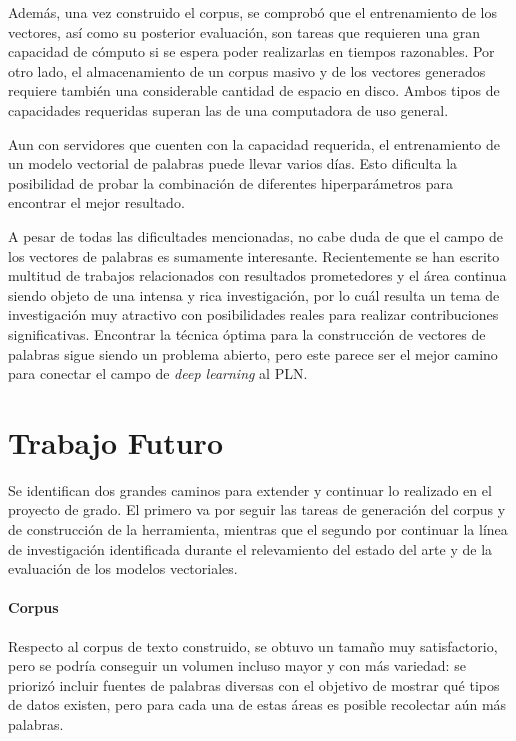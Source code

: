 Además, una vez construido el corpus, se comprobó que el entrenamiento de los vectores, así como su
posterior evaluación, son tareas que requieren una gran capacidad de cómputo si se espera poder
realizarlas en tiempos razonables. Por otro lado, el almacenamiento de un corpus masivo y de los
vectores generados requiere también una considerable cantidad de espacio en disco. Ambos tipos de
capacidades requeridas superan las de una computadora de uso general.

Aun con servidores que cuenten con la capacidad requerida, el entrenamiento de un modelo vectorial de
palabras puede llevar varios días. Esto dificulta la posibilidad de probar la combinación de diferentes
hiperparámetros para encontrar el mejor resultado.

A pesar de todas las dificultades mencionadas, no cabe duda de que el campo de los vectores de palabras
es sumamente interesante. Recientemente se han escrito multitud de trabajos relacionados con resultados
prometedores y el área continua siendo objeto de una intensa y rica investigación, por lo cuál resulta un
tema de investigación muy atractivo con posibilidades reales para realizar contribuciones significativas.
Encontrar la técnica óptima para la construcción de vectores de palabras sigue siendo un problema abierto,
pero este parece ser el mejor camino para conectar el campo de \textit{deep learning} al PLN\@.


\section{Trabajo Futuro}

Se identifican dos grandes caminos para extender y continuar lo realizado en el proyecto de
grado. El primero va por seguir las tareas de generación del corpus y de construcción de la
herramienta, mientras que el segundo por continuar la línea de investigación identificada durante el
relevamiento del estado del arte y de la evaluación de los modelos vectoriales.


\paragraph{Corpus}

Respecto al corpus de texto construido, se obtuvo un tamaño muy satisfactorio, pero se podría
conseguir un volumen incluso mayor y con más variedad: se priorizó incluir fuentes de palabras
diversas con el objetivo de mostrar qué tipos de datos existen, pero para cada una de estas áreas es
posible recolectar aún más palabras.

